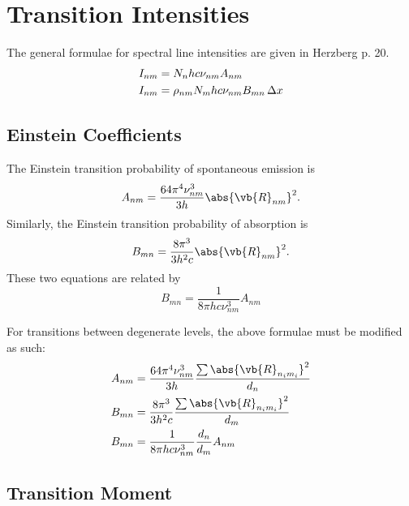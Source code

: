 \documentclass[11pt, twoside, fleqn]{report}
\begin{document}
    \section{Transition Intensities}

    The general formulae for spectral line intensities are given in Herzberg p. 20.
    \begin{align*}
        I_{nm} & = N_{n}hc\nu_{nm}A_{nm}                  \\
        I_{nm} & = \rho_{nm}N_{m}hc\nu_{nm}B_{mn}\adif{x}
    \end{align*}

    \subsection{Einstein Coefficients}

    The Einstein transition probability of spontaneous emission is
    \begin{equation*}
        A_{nm} = \frac{64\pi^{4}\nu_{nm}^{3}}{3h}\abs{\vb{R}_{nm}}^{2}.
    \end{equation*}
    Similarly, the Einstein transition probability of absorption is
    \begin{equation*}
        B_{mn} = \frac{8\pi^{3}}{3h^{2}c}\abs{\vb{R}_{nm}}^{2}.
    \end{equation*}
    These two equations are related by
    \begin{equation*}
        B_{mn} = \frac{1}{8\pi hc\nu_{nm}^{3}}A_{nm}
    \end{equation*}

    For transitions between degenerate levels, the above formulae must be modified as such:
    \begin{align*}
        A_{nm} & = \frac{64\pi^{4}\nu_{nm}^{3}}{3h}\frac{\sum\abs{\vb{R}_{n_{i}m_{i}}}^{2}}{d_{n}} \\
        B_{mn} & = \frac{8\pi^{3}}{3h^{2}c}\frac{\sum\abs{\vb{R}_{n_{i}m_{i}}}^{2}}{d_{m}}         \\
        B_{mn} & = \frac{1}{8\pi hc\nu_{nm}^{3}}\frac{d_{n}}{d_{m}}A_{nm}
    \end{align*}

    \subsection{Transition Moment}
\end{document}
